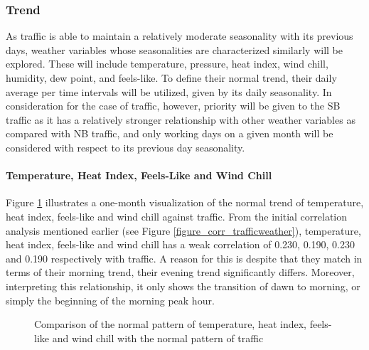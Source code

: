 \subsubsection{Trend}

As traffic is able to maintain a relatively moderate seasonality with its previous days, weather variables whose seasonalities are characterized similarly will be explored. These will include temperature, pressure, heat index, wind chill, humidity, dew point, and feels-like. To define their normal trend, their daily average per time intervals will be utilized, given by its daily seasonality. In consideration for the case of traffic, however, priority will be given to the SB traffic as it has a relatively stronger relationship with other weather variables as compared with NB traffic, and only working days on a given month will be considered with respect to its previous day seasonality.

\paragraph{Temperature, Heat Index, Feels-Like and Wind Chill}

Figure \ref{figure_traffic_vs_tempheatfeelswind} illustrates a one-month visualization of the normal trend of temperature, heat index, feels-like and wind chill against traffic. From the initial correlation analysis mentioned earlier (see Figure \ref{figure_corr_trafficweather}), temperature, heat index, feels-like and wind chill has a weak correlation of 0.230, 0.190, 0.230 and 0.190 respectively with traffic. A reason for this is despite that they match in terms of their morning trend, their evening trend significantly differs. Moreover, interpreting this relationship, it only shows the transition of dawn to morning, or simply the beginning of the morning peak hour.


\begin{figure}[h]
  \centering
  \captionsetup{justification=centering}
  \caption{Comparison of the normal pattern of temperature, heat index, feels-like and wind chill with the normal pattern of traffic}
\label{figure_traffic_vs_tempheatfeelswind}
\end{figure}




